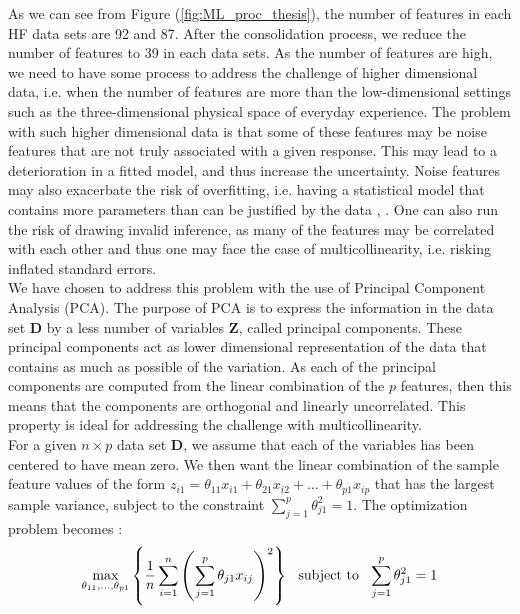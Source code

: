 \documentclass[../thesis.tex]{subfiles}
\begin{document}
\noindent As we can see from Figure (\ref{fig:ML_proc_thesis}), the number of features in each HF data sets are 92 and 87. After the consolidation process, we reduce the number of features to 39 in each data sets. As the number of features are high, we need to have some process to address the challenge of higher dimensional data, i.e. when the number of features are more than the low-dimensional settings such as the three-dimensional physical space of everyday experience. The problem with such higher dimensional data is that some of these features may be noise features that are not truly associated with a given response. This may lead to a deterioration in a fitted model, and thus increase the uncertainty. Noise features may also exacerbate the risk of overfitting, i.e. having a statistical model that contains more parameters than can be justified by the data \citep{friedman2009elements}, \citep{james2013introduction}. One can also run the risk of drawing invalid inference, as many of the features may be correlated with each other and thus one may face the case of multicollinearity, i.e. risking inflated standard errors.\\
\indent We have chosen to address this problem with the use of Principal Component Analysis (PCA). The purpose of PCA is to express the information in the data set $\mathbf{D}$ by a less number of variables $\mathbf{Z}$, called principal components. These principal components act as lower dimensional representation of the data that contains as much as possible of the variation. As each of the principal components are computed from the linear combination of the $p$ features, then this means that the components are orthogonal and linearly uncorrelated. This property is ideal for addressing the challenge with multicollinearity.\\
\indent For a given $n \times p$ data set $\mathbf{D}$, we assume that each of the variables has been centered to have mean zero. We then want the linear combination of the sample feature values of the form $z_{i1} = \theta_{11}x_{i1} + \theta_{21}x_{i2} + \hdots + \theta_{p1}x_{ip}$ that has the largest sample variance, subject to the constraint $\sum_{j = 1}^p \theta_{j1}^2 = 1$. The optimization problem becomes \citep{james2013introduction}:
\begin{align}
    \max_{\theta_{11}, \hdots, \theta_{p1}} \left\{\frac{1}{n} \sum_{i=1}^n \left(\sum_{j=1}^p \theta_{j1}x_{ij} \right)^2 \right\} \hspace{0,25cm} \text{subject to} \hspace{0,25cm} \sum_{j=1}^p\theta^2_{j1} = 1
\end{align}
\end{document}

